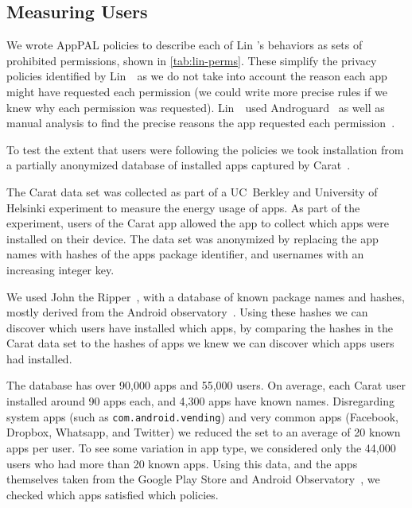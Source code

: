 \documentclass[thesis.tex]{subfiles}
\begin{document}
\subsection{Measuring Users}

We wrote AppPAL policies to describe
each of Lin \etal's behaviors as sets of prohibited permissions, shown in
\autoref{tab:lin-perms}.  These simplify the privacy policies
identified by Lin~\etal~as we do not take into account the reason each
app might have requested each permission (we could write more precise
rules if we knew why each permission was requested).  Lin~\etal~used
Androguard~\cite{andrew_desnos_androguard_2012} as well as manual
analysis to find the precise reasons the app requested each
permission~\cite{lin_modeling_2014}.

To test the extent that users were following the policies we took
installation from a partially anonymized database of installed apps
captured by Carat~\cite{oliner_carat:_2013}.

The Carat data set was collected as part of a UC~Berkley and University
of Helsinki experiment to measure the energy usage of apps.  As part
of the experiment, users of the Carat app allowed the app to collect
which apps were installed on their device.  The data set was anonymized
by replacing the app names with hashes of the apps package identifier,
and usernames with an increasing integer key.

We used John the Ripper~\cite{solar_designer_john_2013}, with a
database of known package names and hashes, mostly derived from the
Android observatory~\cite{barrera_understanding_2012}.  Using these
hashes we can discover which users have installed which apps, by
comparing the hashes in the Carat data set to the hashes of apps we
knew we can discover which apps users had installed.

The database has over 90,000 apps and 55,000 users.  On average, each
Carat user installed around 90 apps each, and 4,300 apps have known names.
Disregarding system apps (such as \texttt{com.android.vending}) and
very common apps (Facebook, Dropbox, Whatsapp, and Twitter) we reduced
the set to an average of 20 known apps per user.  To see some
variation in app type, we considered only the 44,000 users who had
more than 20 known apps.  Using this data, and the apps themselves
taken from the Google Play Store and Android
Observatory~\cite{barrera_understanding_2012}, we checked which apps
satisfied which policies.
\end{document}
